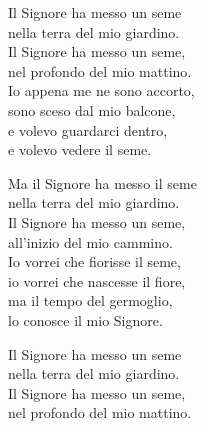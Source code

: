 
\strofa Il Signore ha messo un seme\\
nella terra del mio giardino.\\
Il Signore ha messo un seme,\\
nel profondo del mio mattino.\\
Io appena me ne sono accorto,\\
sono sceso dal mio balcone,\\
e volevo guardarci dentro,\\
e volevo vedere il seme.

\spazio

\strofa Ma il Signore ha messo il seme\\
nella terra del mio giardino.\\
Il Signore ha messo un seme,\\
all'inizio del mio cammino.\\
Io vorrei che fiorisse il seme,\\
io vorrei che nascesse il fiore,\\
ma il tempo del germoglio,\\
lo conosce il mio Signore.

\spazio

\strofa Il Signore ha messo un seme\\
nella terra del mio giardino.\\
Il Signore ha messo un seme,\\
nel profondo del mio mattino.
